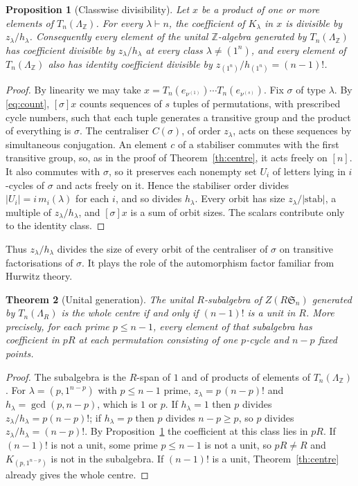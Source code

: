 \documentclass[11pt,a4paper]{article}
\newtheorem{theorem}{Theorem}[section]
\newtheorem{proposition}[theorem]{Proposition}
\theoremstyle{definition}
\newcommand{\Sn}{\mathfrak S}
\newcommand{\Z}{\mathbb Z}
\begin{document}
\begin{proposition}[Classwise divisibility]\label{prop:orbit}
Let $x$ be a product of one or more elements of $T_n(\Lambda_\Z)$. For every $\lambda\vdash n$, the coefficient of $K_\lambda$ in $x$ is divisible by $z_\lambda/h_\lambda$. Consequently every element of the unital $\Z$-algebra generated by $T_n(\Lambda_\Z)$ has coefficient divisible by $z_\lambda/h_\lambda$ at every class $\lambda\ne(1^n)$, and every element of $T_n(\Lambda_\Z)$ also has identity coefficient divisible by $z_{(1^n)}/h_{(1^n)}=(n-1)!$.
\end{proposition}
\begin{proof}
By linearity we may take $x=T_n(e_{\nu^{(1)}})\cdots T_n(e_{\nu^{(s)}})$. Fix $\sigma$ of type $\lambda$. By \eqref{eq:count}, $[\sigma]x$ counts sequences of $s$ tuples of permutations, with prescribed cycle numbers, such that each tuple generates a transitive group and the product of everything is $\sigma$. The centraliser $C(\sigma)$, of order $z_\lambda$, acts on these sequences by simultaneous conjugation. An element $c$ of a stabiliser commutes with the first transitive group, so, as in the proof of Theorem~\ref{th:centre}, it acts freely on $[n]$. It also commutes with $\sigma$, so it preserves each nonempty set $U_i$ of letters lying in $i$-cycles of $\sigma$ and acts freely on it. Hence the stabiliser order divides $|U_i|=i\,m_i(\lambda)$ for each $i$, and so divides $h_\lambda$. Every orbit has size $z_\lambda/|\mathrm{stab}|$, a multiple of $z_\lambda/h_\lambda$, and $[\sigma]x$ is a sum of orbit sizes. The scalars contribute only to the identity class.
\end{proof}

Thus $z_\lambda/h_\lambda$ divides the size of every orbit of the centraliser of $\sigma$ on transitive factorisations of $\sigma$. It plays the role of the automorphism factor familiar from Hurwitz theory.

\begin{theorem}[Unital generation]\label{th:unital}
The unital $R$-subalgebra of $Z(R\Sn_n)$ generated by $T_n(\Lambda_R)$ is the whole centre if and only if $(n-1)!$ is a unit in $R$. More precisely, for each prime $p\le n-1$, every element of that subalgebra has coefficient in $pR$ at each permutation consisting of one $p$-cycle and $n-p$ fixed points.
\end{theorem}
\begin{proof}
The subalgebra is the $R$-span of $1$ and of products of elements of $T_n(\Lambda_\Z)$. For $\lambda=(p,1^{n-p})$ with $p\le n-1$ prime, $z_\lambda=p\,(n-p)!$ and $h_\lambda=\gcd(p,n-p)$, which is $1$ or $p$. If $h_\lambda=1$ then $p$ divides $z_\lambda/h_\lambda=p(n-p)!$; if $h_\lambda=p$ then $p$ divides $n-p\ge p$, so $p$ divides $z_\lambda/h_\lambda=(n-p)!$. By Proposition~\ref{prop:orbit} the coefficient at this class lies in $pR$. If $(n-1)!$ is not a unit, some prime $p\le n-1$ is not a unit, so $pR\ne R$ and $K_{(p,1^{n-p})}$ is not in the subalgebra. If $(n-1)!$ is a unit, Theorem~\ref{th:centre} already gives the whole centre.
\end{proof}
\end{document}

